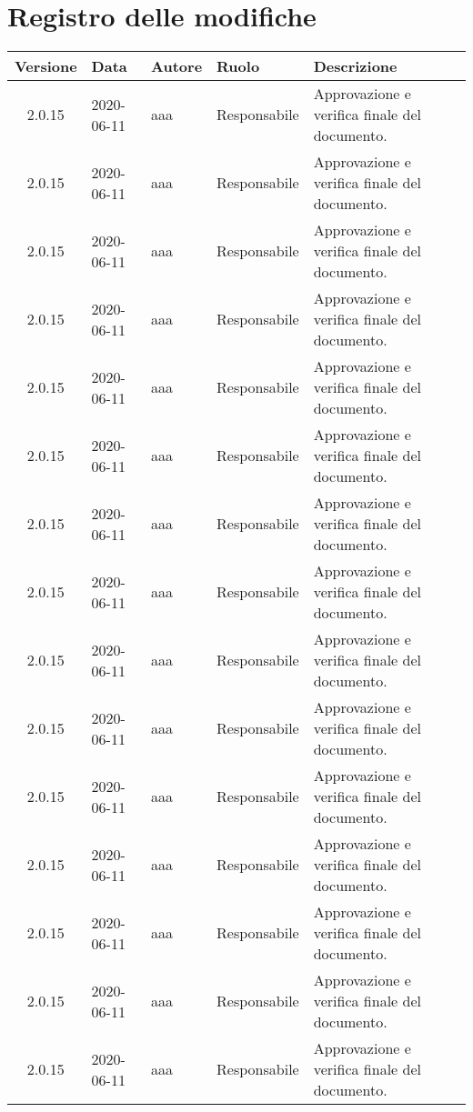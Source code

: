 \section*{Registro delle modifiche}
\setcounter{table}{-1}
{


\centering
\renewcommand{\arraystretch}{1.5}
\begin{longtable}{c C{2.5cm} C{3.5cm} C{2.5cm} C{3.5cm}}
\textbf{Versione} &
\textbf{Data}&
\textbf{Autore}&
\textbf{Ruolo}&
\textbf{Descrizione}\\
\endhead

2.0.15 & 2020-06-11 & aaa & Responsabile & Approvazione e verifica finale del documento. \\
2.0.15 & 2020-06-11 & aaa & Responsabile & Approvazione e verifica finale del documento. \\
2.0.15 & 2020-06-11 & aaa & Responsabile & Approvazione e verifica finale del documento. \\
2.0.15 & 2020-06-11 & aaa & Responsabile & Approvazione e verifica finale del documento. \\
2.0.15 & 2020-06-11 & aaa & Responsabile & Approvazione e verifica finale del documento. \\
2.0.15 & 2020-06-11 & aaa & Responsabile & Approvazione e verifica finale del documento. \\
2.0.15 & 2020-06-11 & aaa & Responsabile & Approvazione e verifica finale del documento. \\
2.0.15 & 2020-06-11 & aaa & Responsabile & Approvazione e verifica finale del documento. \\
2.0.15 & 2020-06-11 & aaa & Responsabile & Approvazione e verifica finale del documento. \\
2.0.15 & 2020-06-11 & aaa & Responsabile & Approvazione e verifica finale del documento. \\
2.0.15 & 2020-06-11 & aaa & Responsabile & Approvazione e verifica finale del documento. \\
2.0.15 & 2020-06-11 & aaa & Responsabile & Approvazione e verifica finale del documento. \\
2.0.15 & 2020-06-11 & aaa & Responsabile & Approvazione e verifica finale del documento. \\
2.0.15 & 2020-06-11 & aaa & Responsabile & Approvazione e verifica finale del documento. \\
2.0.15 & 2020-06-11 & aaa & Responsabile & Approvazione e verifica finale del documento. \\

\end{longtable}}
